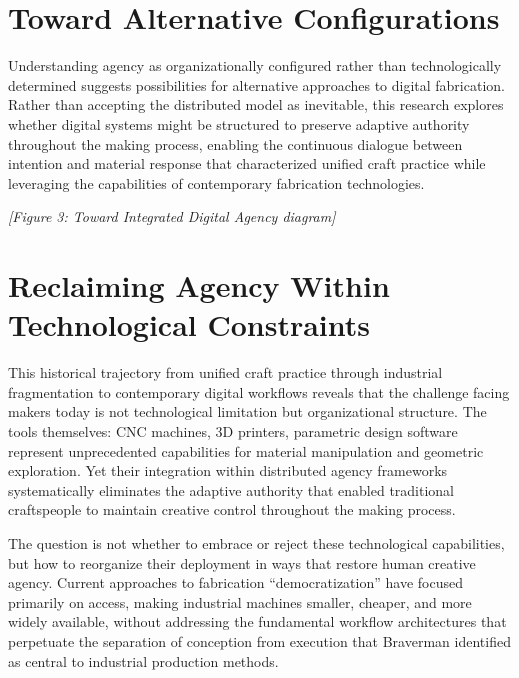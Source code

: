 \section{Toward Alternative Configurations}

Understanding agency as organizationally configured rather than technologically determined suggests possibilities for alternative approaches to digital fabrication. Rather than accepting the distributed model as inevitable, this research explores whether digital systems might be structured to preserve adaptive authority throughout the making process, enabling the continuous dialogue between intention and material response that characterized unified craft practice while leveraging the capabilities of contemporary fabrication technologies.

\vspace{0.5cm}

\textit{[Figure 3: Toward Integrated Digital Agency diagram]}

\section{Reclaiming Agency Within Technological Constraints}

This historical trajectory from unified craft practice through industrial fragmentation to contemporary digital workflows reveals that the challenge facing makers today is not technological limitation but organizational structure. The tools themselves: CNC machines, 3D printers, parametric design software represent unprecedented capabilities for material manipulation and geometric exploration. Yet their integration within distributed agency frameworks systematically eliminates the adaptive authority that enabled traditional craftspeople to maintain creative control throughout the making process.

\vspace{0.5cm}

The question is not whether to embrace or reject these technological capabilities, but how to reorganize their deployment in ways that restore human creative agency. Current approaches to fabrication ``democratization'' have focused primarily on access, making industrial machines smaller, cheaper, and more widely available, without addressing the fundamental workflow architectures that perpetuate the separation of conception from execution that Braverman identified as central to industrial production methods.

\vspace{0.5cm}

